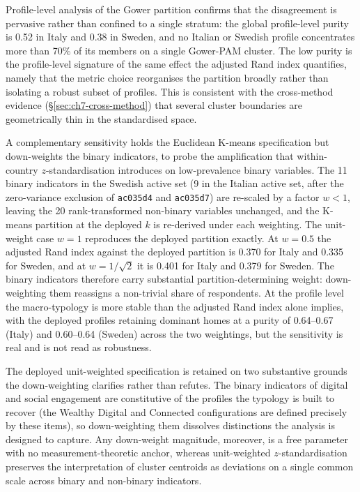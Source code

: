 Profile-level analysis of the Gower partition confirms that the disagreement is pervasive rather than confined to a single stratum: the global profile-level purity is 0.52 in Italy and 0.38 in Sweden, and no Italian or Swedish profile concentrates more than 70\% of its members on a single Gower-PAM cluster. The low purity is the profile-level signature of the same effect the adjusted Rand index quantifies, namely that the metric choice reorganises the partition broadly rather than isolating a robust subset of profiles. This is consistent with the cross-method evidence (\S\ref{sec:ch7-cross-method}) that several cluster boundaries are geometrically thin in the standardised space.

A complementary sensitivity holds the Euclidean K-means specification but down-weights the binary indicators, to probe the amplification that within-country $z$-standardisation introduces on low-prevalence binary variables. The 11 binary indicators in the Swedish active set (9 in the Italian active set, after the zero-variance exclusion of \texttt{ac035d4} and \texttt{ac035d7}) are re-scaled by a factor $w < 1$, leaving the 20 rank-transformed non-binary variables unchanged, and the K-means partition at the deployed $k$ is re-derived under each weighting. The unit-weight case $w = 1$ reproduces the deployed partition exactly. At $w = 0.5$ the adjusted Rand index against the deployed partition is 0.370 for Italy and 0.335 for Sweden, and at $w = 1/\sqrt{2}$ it is 0.401 for Italy and 0.379 for Sweden. The binary indicators therefore carry substantial partition-determining weight: down-weighting them reassigns a non-trivial share of respondents. At the profile level the macro-typology is more stable than the adjusted Rand index alone implies, with the deployed profiles retaining dominant homes at a purity of 0.64--0.67 (Italy) and 0.60--0.64 (Sweden) across the two weightings, but the sensitivity is real and is not read as robustness.

The deployed unit-weighted specification is retained on two substantive grounds the down-weighting clarifies rather than refutes. The binary indicators of digital and social engagement are constitutive of the profiles the typology is built to recover (the Wealthy Digital and Connected configurations are defined precisely by these items), so down-weighting them dissolves distinctions the analysis is designed to capture. Any down-weight magnitude, moreover, is a free parameter with no measurement-theoretic anchor, whereas unit-weighted $z$-standardisation preserves the interpretation of cluster centroids as deviations on a single common scale across binary and non-binary indicators.

